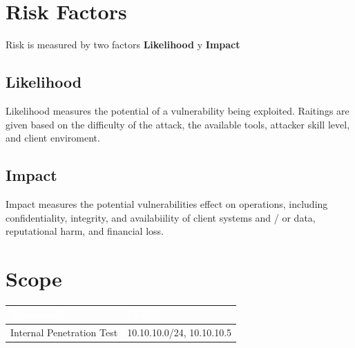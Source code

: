\documentclass[a4paper]{article} %
\begin{document}
    \section{Risk Factors}
    Risk is measured by two factors \textbf{Likelihood} y \textbf{Impact}
    
    \subsection{Likelihood}
    Likelihood measures the potential of a vulnerability being exploited. Raitings are given based on the difficulty of the attack, the available tools, attacker skill level, and client enviroment.

    \subsection{Impact}
    Impact measures the potential vulnerabilities effect on operations, including confidentiality, integrity, and availabiility of client systems and / or data, reputational harm, and financial loss.
    


    \clearpage

    \section{Scope} %
    \begin{table}[htbp]
        \begin{tabularx}{\textwidth}{|X|X|}
            \hline
            \rowcolor{blueColor}
            \textbf{\textcolor{white}{Assessment}} & \textbf{\textcolor{white}{Details}} \\
            \hline
            {Internal Penetration Test} & {10.10.10.0/24, 10.10.10.5} \\
            \hline
        \end{tabularx}
    \end{table}
\end{document}
